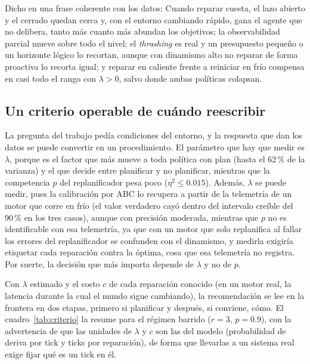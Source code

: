 Dicho en una frase coherente con los datos: Cuando reparar cuesta, el lazo abierto y el cerrado quedan cerca y, con el entorno cambiando rápido, gana el agente que no delibera, tanto más cuanto más abundan los objetivos; la observabilidad parcial mueve sobre todo el nivel; el \emph{thrashing} es real y un presupuesto pequeño o un horizonte lógico lo recortan, aunque con dinamismo alto no reparar de forma proactiva lo recorta igual; y reparar en caliente frente a reiniciar en frío compensa en casi todo el rango con $\lambda>0$, salvo donde ambas políticas colapsan.

\subsection{Un criterio operable de cuándo reescribir}\label{sec:disc-criterio}

La pregunta del trabajo pedía condiciones del entorno, y la respuesta que dan los datos se puede convertir en un procedimiento. El parámetro que hay que medir es $\lambda$, porque es el factor que más mueve a toda política con plan (hasta el 62\,\% de la varianza) y el que decide entre planificar y no planificar, mientras que la competencia $p$ del replanificador pesa poco ($\eta^2\le0.015$). Además, $\lambda$ se puede medir, pues la calibración por ABC lo recupera a partir de la telemetría de un motor que corre en frío (el valor verdadero cayó dentro del intervalo creíble del 90\,\% en los tres casos), aunque con precisión moderada, mientras que $p$ no es identificable con esa telemetría, ya que con un motor que solo replanifica al fallar los errores del replanificador se confunden con el dinamismo, y medirla exigiría etiquetar cada reparación contra la óptima, cosa que esa telemetría no registra. Por suerte, la decisión que más importa depende de $\lambda$ y no de $p$.

Con $\lambda$ estimado y el costo $c$ de cada reparación conocido (en un motor real, la latencia durante la cual el mundo sigue cambiando), la recomendación se lee en la frontera en dos etapas, primero si planificar y después, si conviene, cómo. El cuadro~\ref{tab:criterio} la resume para el régimen barrido ($r=3$, $p=0.9$), con la advertencia de que las unidades de $\lambda$ y $c$ son las del modelo (probabilidad de deriva por tick y ticks por reparación), de forma que llevarlas a un sistema real exige fijar qué es un tick en él.

